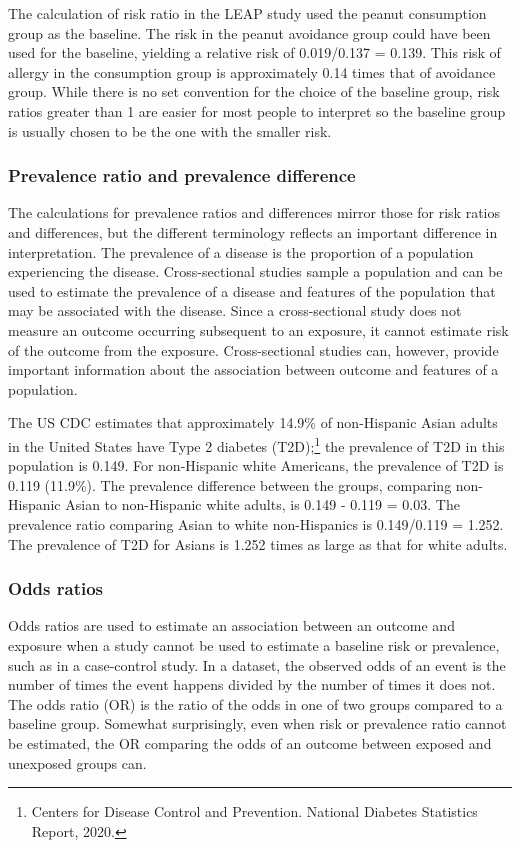 The calculation of risk ratio in the LEAP study used the peanut consumption group as the baseline.  The risk in the peanut avoidance group could have been used for the baseline, yielding a relative risk of 0.019/0.137 = 0.139.  This risk of allergy in the consumption group is approximately 0.14 times that of avoidance group.  While there is no set convention for the choice of the baseline group, risk ratios greater than 1 are easier for most people to interpret so the baseline group is usually chosen to be the one with the smaller risk.

\subsubsection{Prevalence ratio and prevalence difference}

The calculations for prevalence ratios and differences mirror those for risk ratios and differences, but the different terminology reflects an important difference in interpretation.  The prevalence of a disease is the proportion of a population experiencing the disease.  Cross-sectional studies sample a population and can be used to estimate the prevalence of a disease and features of the population that may be associated with the disease. Since a cross-sectional study does not measure an outcome occurring subsequent to an exposure, it cannot estimate risk of the outcome from the exposure.  Cross-sectional studies can, however, provide important information about the association between outcome and features of a population.

The US CDC estimates that approximately 14.9\% of non-Hispanic Asian adults in the United States have Type 2 diabetes (T2D);\footnote{Centers for Disease Control and Prevention. National Diabetes Statistics Report, 2020.}  the prevalence of T2D in this population is 0.149.  For non-Hispanic white Americans, the prevalence of T2D is 0.119 (11.9\%). The prevalence difference between the groups, comparing non-Hispanic Asian to non-Hispanic white adults, is 0.149 - 0.119 = 0.03.  The prevalence ratio comparing Asian to white non-Hispanics is 0.149/0.119 = 1.252.  The prevalence of T2D for Asians is 1.252 times as large as that for white adults.

\subsubsection{Odds ratios}

Odds ratios are used to estimate an association between an outcome and exposure when a study cannot be used to estimate a baseline risk or prevalence, such as in a case-control study. In a dataset, the observed odds of an event is the number of times the event happens divided by the number of times it does not.  The odds ratio (OR) is the ratio of the odds in one of two groups compared to a baseline group.  Somewhat surprisingly, even when risk or prevalence ratio cannot be estimated, the OR comparing the odds of an outcome between exposed and unexposed groups can.


